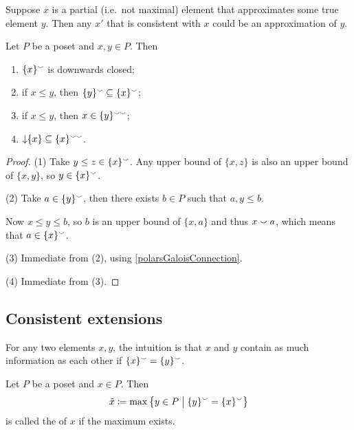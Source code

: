 Suppose $x$ is a partial (i.e.\ not maximal) element that approximates some true element $y$. Then any $x'$ that is consistent with $x$ could be an approximation of $y$.

\begin{lemma} \label{consistencyInclusionFromInequality}
Let $P$ be a poset and $x,y\in P$. Then
\begin{enumerate}
\item $\{x\}^\smallsmile$ is downwards closed;
\item if $x \leq y$, then $\{y\}^\smallsmile \subseteq \{x\}^\smallsmile$;
\item if $x \leq y$, then $x\in \{y\}^{\smallsmile\smallsmile}$;
\item $\operatorname{\downarrow} \{x\} \subseteq \{x\}^{\smallsmile\smallsmile}$.
\end{enumerate}
\end{lemma}
\begin{proof}
(1) Take $y \leq z \in \{x\}^\smallsmile$. Any upper bound of $\{x,z\}$ is also an upper bound of $\{x,y\}$, so $y\in \{x\}^\smallsmile$.

(2) Take $a\in \{y\}^\smallsmile$, then there exists $b\in P$ such that $a,y \leq b$.

Now $x\leq y\leq b$, so $b$ is an upper bound of $\{x,a\}$ and thus $x\smallsmile a$, which means that $a\in \{x\}^\smallsmile$.

(3) Immediate from (2), using \ref{polarsGaloisConnection}.

(4) Immediate from (3).
\end{proof}

\subsection{Consistent extensions}
For any two elements $x,y$, the intuition is that $x$ and $y$ contain as much information as each other if $\{x\}^\smallsmile = \{y\}^\smallsmile$.

\begin{definition}
Let $P$ be a poset and $x\in P$. Then
\[ \tilde{x} \defeq \max \setbuilder[\big]{y\in P}{ \{y\}^\cons = \{x\}^\cons } \]
is called the  of $x$ if the maximum exists.
\end{definition}


